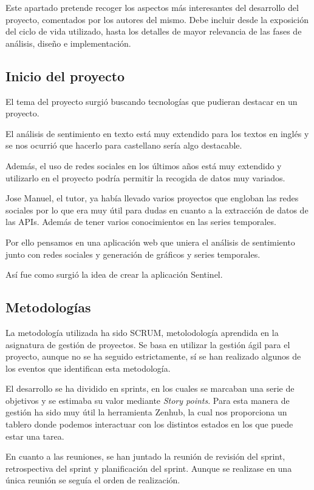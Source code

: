 
Este apartado pretende recoger los aspectos más interesantes del desarrollo del proyecto, comentados por los autores del mismo.
Debe incluir desde la exposición del ciclo de vida utilizado, hasta los detalles de mayor relevancia de las fases de análisis, diseño e implementación.

\subsection{Inicio del proyecto}
El tema del proyecto surgió buscando tecnologías que pudieran destacar en un proyecto.

El análisis de sentimiento en texto está muy extendido para los textos en inglés y se nos ocurrió que hacerlo para castellano sería algo destacable.

Además, el uso de redes sociales en los últimos años está muy extendido y utilizarlo en el proyecto podría permitir la recogida de datos muy variados.

Jose Manuel, el tutor, ya había llevado varios proyectos que engloban las redes sociales por lo que era muy útil para dudas en cuanto a la extracción de datos de las APIs. Además de tener varios conocimientos en las series temporales.

Por ello pensamos en una aplicación web que uniera el análisis de sentimiento junto con redes sociales y generación de gráficos y series temporales.

Así fue como surgió la idea de crear la aplicación Sentinel.


\subsection{Metodologías}
La metodología utilizada ha sido SCRUM, metolodología aprendida en la asignatura de gestión de proyectos. Se basa en utilizar la gestión ágil para el proyecto, aunque no se ha seguido estrictamente, sí se han realizado algunos de los eventos que identifican esta metodología.

El desarrollo se ha dividido en sprints, en los cuales se marcaban una serie de objetivos y se estimaba su valor mediante \textit{Story points}. Para esta manera de gestión ha sido muy útil la herramienta Zenhub, la cual nos proporciona un tablero donde podemos interactuar con los distintos estados en los que puede estar una tarea.

En cuanto a las reuniones, se han juntado la reunión de revisión del sprint, retrospectiva del sprint y planificación del sprint. 
Aunque se realizase en una única reunión se seguía el orden de realización.

